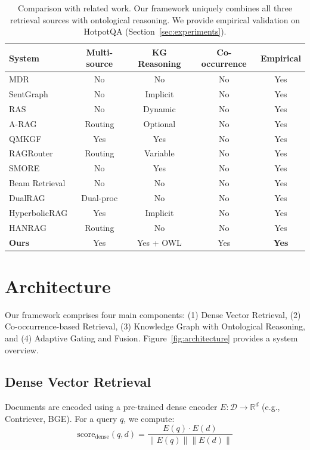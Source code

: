 \documentclass[11pt,a4paper]{article}
\begin{document}
\begin{table}[h]
\centering
\small
\begin{tabular}{lcccc}
\toprule
\textbf{System} & \textbf{Multi-source} & \textbf{KG Reasoning} & \textbf{Co-occurrence} & \textbf{Empirical} \\
\midrule
MDR & No & No & No & Yes \\
SentGraph & No & Implicit & No & Yes \\
RAS & No & Dynamic & No & Yes \\
A-RAG & Routing & Optional & No & Yes \\
QMKGF & Yes & Yes & No & Yes \\
RAGRouter & Routing & Variable & No & Yes \\
SMORE & No & Yes & No & Yes \\
Beam Retrieval & No & No & No & Yes \\
DualRAG & Dual-proc & No & No & Yes \\
HyperbolicRAG & Yes & Implicit & No & Yes \\
HANRAG & Routing & No & No & Yes \\
\midrule
\textbf{Ours} & Yes & Yes + OWL & Yes & \textbf{Yes} \\
\bottomrule
\end{tabular}
\caption{Comparison with related work. Our framework uniquely combines all three retrieval sources with ontological reasoning. We provide empirical validation on HotpotQA (Section~\ref{sec:experiments}).}
\label{tab:related_work}
\end{table}

\section{Architecture}
\label{sec:architecture}

Our framework comprises four main components: (1) Dense Vector Retrieval, (2) Co-occurrence-based Retrieval, (3) Knowledge Graph with Ontological Reasoning, and (4) Adaptive Gating and Fusion. Figure~\ref{fig:architecture} provides a system overview.

\subsection{Dense Vector Retrieval}
\label{sec:dense_retrieval}

Documents are encoded using a pre-trained dense encoder $E: \mathcal{D} \rightarrow \mathbb{R}^d$ (e.g., Contriever, BGE). For a query $q$, we compute:
\begin{equation}
\text{score}_{\text{dense}}(q, d) = \frac{E(q) \cdot E(d)}{\|E(q)\| \|E(d)\|}
\end{equation}
\end{document}
